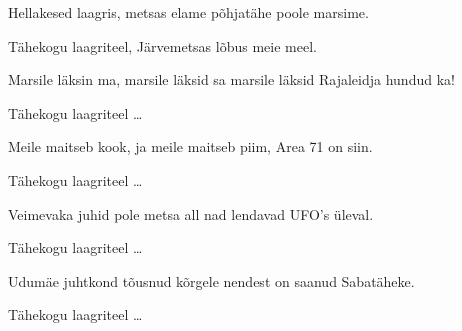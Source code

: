 Hellakesed laagris, metsas elame
p\~ohjat\"ahe poole marsime.

T\"ahekogu laagriteel,
J\"arvemetsas l\~obus meie meel.

Marsile l\"aksin ma, marsile l\"aksid sa
marsile l\"aksid Rajaleidja hundud ka!

T\"ahekogu laagriteel \ldots

Meile maitseb kook, ja meile maitseb piim,
Area 71 on siin.

T\"ahekogu laagriteel \ldots

Veimevaka juhid pole metsa all
nad lendavad UFO's \"uleval.

T\"ahekogu laagriteel \ldots

Udum\"ae juhtkond t\~ousnud k\~orgele
nendest on saanud Sabat\"aheke.

T\"ahekogu laagriteel \ldots